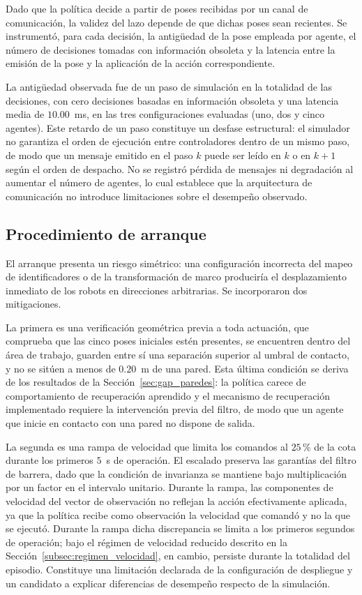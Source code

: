 Dado que la política decide a partir de poses recibidas por un canal de
comunicación, la validez del lazo depende de que dichas poses sean recientes.
Se instrumentó, para cada decisión, la antigüedad de la pose empleada por
agente, el número de decisiones tomadas con información obsoleta y la latencia
entre la emisión de la pose y la aplicación de la acción correspondiente.

La antigüedad observada fue de un paso de simulación en la totalidad de las
decisiones, con cero decisiones basadas en información obsoleta y una latencia
media de $10{.}00$~ms, en las tres configuraciones evaluadas (uno, dos y cinco
agentes). Este retardo de un paso constituye un desfase estructural: el
simulador no garantiza el orden de ejecución entre controladores dentro de un
mismo paso, de modo que un mensaje emitido en el paso $k$ puede ser leído en
$k$ o en $k+1$ según el orden de despacho. No se registró pérdida de mensajes
ni degradación al aumentar el número de agentes, lo cual establece que la
arquitectura de comunicación no introduce limitaciones sobre el desempeño
observado.

\subsection*{Procedimiento de arranque}

El arranque presenta un riesgo simétrico: una configuración incorrecta del
mapeo de identificadores o de la transformación de marco produciría el
desplazamiento inmediato de los robots en direcciones arbitrarias. Se
incorporaron dos mitigaciones.

La primera es una verificación geométrica previa a toda actuación, que
comprueba que las cinco poses iniciales estén presentes, se encuentren dentro
del área de trabajo, guarden entre sí una separación superior al umbral de
contacto, y no se sitúen a menos de $0{.}20$~m de una pared. Esta última
condición se deriva de los resultados de la Sección~\ref{sec:gap_paredes}: la
política carece de comportamiento de recuperación aprendido y el mecanismo de
recuperación implementado requiere la intervención previa del filtro, de modo
que un agente que inicie en contacto con una pared no dispone de salida.

La segunda es una rampa de velocidad que limita los comandos al $25$\,\% de la cota durante los primeros $5$~s de operación. El
escalado preserva las garantías del filtro de barrera, dado que la condición
de invarianza se mantiene bajo multiplicación por un factor en el intervalo
unitario. Durante la rampa, las componentes de
velocidad del vector de observación no reflejan la acción efectivamente
aplicada, ya que la política recibe como observación la velocidad que comandó y no la
que se ejecutó. Durante la rampa dicha discrepancia se limita a los primeros
segundos de operación; bajo el régimen de velocidad reducido descrito en la
Sección~\ref{subsec:regimen_velocidad}, en cambio, persiste durante la
totalidad del episodio. Constituye una limitación declarada de la configuración
de despliegue y un candidato a explicar diferencias de desempeño respecto de la
simulación.

